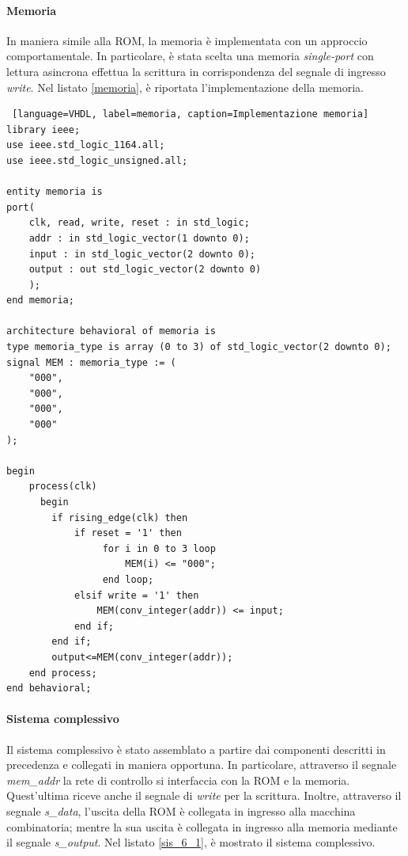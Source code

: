 \paragraph{Memoria}
In maniera simile alla ROM, la memoria è implementata con un approccio comportamentale. In particolare, è stata scelta una memoria \textit{single-port} con lettura asincrona effettua la scrittura in corrispondenza del segnale di ingresso \textit{write}. Nel listato \ref{memoria}, è riportata l'implementazione della memoria.
\begin{lstlisting} [language=VHDL, label=memoria, caption=Implementazione memoria]
library ieee;
use ieee.std_logic_1164.all;
use ieee.std_logic_unsigned.all;

entity memoria is
port(
    clk, read, write, reset : in std_logic; 
    addr : in std_logic_vector(1 downto 0);
    input : in std_logic_vector(2 downto 0);
    output : out std_logic_vector(2 downto 0)
    );
end memoria;

architecture behavioral of memoria is 
type memoria_type is array (0 to 3) of std_logic_vector(2 downto 0);
signal MEM : memoria_type := (
    "000", 
    "000", 
    "000", 
    "000"
);

begin
    process(clk)
      begin
        if rising_edge(clk) then
            if reset = '1' then
                 for i in 0 to 3 loop 
                     MEM(i) <= "000";
                 end loop;
            elsif write = '1' then
                MEM(conv_integer(addr)) <= input;        
            end if;
        end if;
        output<=MEM(conv_integer(addr));   
    end process;
end behavioral;
\end{lstlisting}

\paragraph{Sistema complessivo} Il sistema complessivo è stato assemblato a partire dai componenti descritti in precedenza e collegati in maniera opportuna. In particolare, attraverso il segnale \textit{mem\_addr} la rete di controllo si interfaccia con la ROM e la memoria. Quest'ultima riceve anche il segnale di \textit{write} per la scrittura. Inoltre, attraverso il segnale \textit{s\_data}, l'uscita della ROM è collegata in ingresso alla macchina combinatoria; mentre la sua uscita è collegata in ingresso alla memoria mediante il segnale \textit{s\_output}. Nel listato \ref{sis_6_1}, è mostrato il sistema complessivo.

